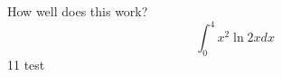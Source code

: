 \documentclass{article}
\begin{document}
How well does this work?
$$\int_0^4 x^2 \ln{2x}dx$$
11  test
\end{document}
